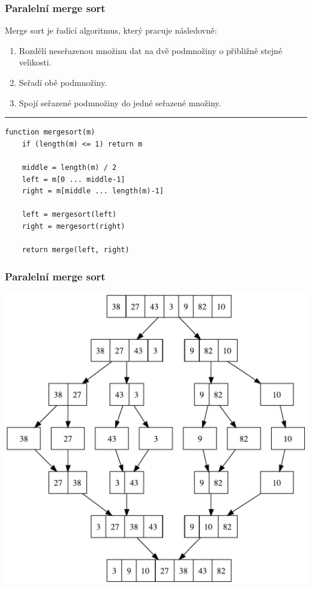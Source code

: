 \documentclass[usenames,dvipsnames,9pt]{beamer}
\begin{document}
\begin{frame}[fragile]
\frametitle{Paralelní merge sort}

Merge sort je řadící algoritmus, který pracuje následovně:

\begin{enumerate}
\item Rozdělí neseřazenou množinu dat na dvě podmnožiny o přibližně stejné velikosti.
\item Seřadí obě podmnožiny.
\item Spojí seřazené podmnožiny do jedné seřazené množiny.
\end{enumerate}

\vspace{1em}\hrule\vspace{1em}

\begin{verbatim}
function mergesort(m)
    if (length(m) <= 1) return m

    middle = length(m) / 2
    left = m[0 ... middle-1]
    right = m[middle ... length(m)-1]

    left = mergesort(left)
    right = mergesort(right)

    return merge(left, right)
\end{verbatim}

  
\end{frame}

\begin{frame}[fragile]
\frametitle{Paralelní merge sort}

\begin{center}
\includegraphics[width=.7\linewidth]{06/figs/mergesort.pdf}
\end{center}

  
\end{frame}
\end{document}
